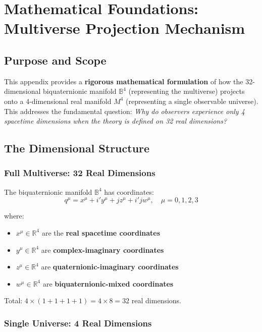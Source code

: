 \section{Mathematical Foundations: Multiverse Projection Mechanism}
\label{app:multiverse_projection}

\subsection{Purpose and Scope}

This appendix provides a \textbf{rigorous mathematical formulation} of how the 32-dimensional biquaternionic manifold $\mathbb{B}^4$ (representing the multiverse) projects onto a 4-dimensional real manifold $M^4$ (representing a single observable universe). This addresses the fundamental question: \emph{Why do observers experience only 4 spacetime dimensions when the theory is defined on 32 real dimensions?}

\subsection{The Dimensional Structure}

\subsubsection{Full Multiverse: 32 Real Dimensions}

The biquaternionic manifold $\mathbb{B}^4$ has coordinates:
\begin{equation}
q^{\mu} = x^{\mu} + i' y^{\mu} + j z^{\mu} + i'j w^{\mu}, \quad \mu = 0,1,2,3
\end{equation}

where:
\begin{itemize}
\item $x^{\mu} \in \mathbb{R}^4$ are the \textbf{real spacetime coordinates}
\item $y^{\mu} \in \mathbb{R}^4$ are \textbf{complex-imaginary coordinates}
\item $z^{\mu} \in \mathbb{R}^4$ are \textbf{quaternionic-imaginary coordinates}
\item $w^{\mu} \in \mathbb{R}^4$ are \textbf{biquaternionic-mixed coordinates}
\end{itemize}

Total: $4 \times (1 + 1 + 1 + 1) = 4 \times 8 = 32$ real dimensions.

\subsubsection{Single Universe: 4 Real Dimensions}


